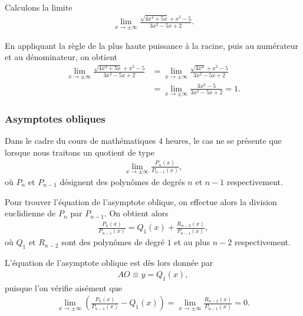 \documentclass[main.tex]{subfiles}
\begin{document}
\begin{example}

    Calculons la limite
    \begin{align}
        \lim_{x \to \pm \infty} \frac {\sqrt{4x^4 + 5x} + x^2 - 5} {3 x^2 - 5x + 2}.
    \end{align}

    En appliquant la règle de la plus haute puissance à la racine,
    puis au numérateur et au dénominateur,
    on obtient
    \begin{align}
        \lim_{x \to \pm \infty} \frac {\sqrt{4x^4 + 5x} + x^2 - 5} {3 x^2 - 5x + 2}
        &= \lim_{x \to \pm \infty} \frac {\sqrt{4x^4} + x^2 - 5} {3 x^2 - 5x + 2}\\
        &= \lim_{x \to \pm \infty} \frac {3 x^2 - 5} {3 x^2 - 5x + 2} = 1.
    \end{align}
\end{example}

\subsubsection{Asymptotes obliques}

Dans le cadre du cours de mathématiques $4$ heures,
le cas ne se présente que lorsque nous traitons un quotient de type
\begin{align}
    \lim_{x \to \pm \infty} \frac {P_n(x)} {P_{n - 1}(x)},
\end{align}
où $P_n$ et $P_{n - 1}$ désignent des polynômes de degrés $n$ et $n - 1$ respectivement.

Pour trouver l'équation de l'asymptote oblique,
on effectue alors la division euclidienne de $P_n$ par $P_{n - 1}$.
On obtient alors
\begin{align}
    \frac {P_n(x)} {P_{n - 1}(x)} = Q_1(x) + \frac {R_{n - 2}(x)} {P_{n - 1}(x)},
\end{align}
où $Q_1$ et $R_{n - 2}$ sont des polynômes de degré $1$ et au plus $n - 2$ respectivement.

L'équation de l'asymptote oblique est dès lors donnée par
\begin{align}
    AO \equiv y = Q_1(x),
\end{align}
puisque l'on vérifie aisément que
\begin{align}
    \lim_{x \to \pm \infty} \left(\frac {P_n(x)} {P_{n - 1}(x)} - Q_1(x)\right)
    = \lim_{x \to \pm \infty} \frac {R_{n - 2}(x)} {P_{n - 1}(x)} = 0.
\end{align}
\end{document}
